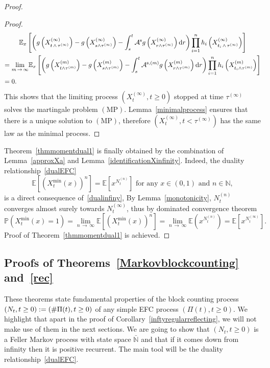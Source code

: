 \documentclass[10pt]{amsart}
\theoremstyle{definition}\newtheorem{defi}[theo]{Definition}\newtheorem{rema}[theo]{Remark}\newtheorem{exam}[theo]{Example}\newtheorem{exem}[theo]{Example}\newtheorem{nota}[theo]{Notation}
\newcommand{\ddr}{\mathrm{d}}
\newcommand{\rms}{\mathrm{s}}
\newcommand{\MP}{\mathrm{MP}}
\newcommand{\bbN}{\mathbb{N}}
\newcommand{\bbE}{\mathbb{E}}
\newcommand{\bbP}{\mathbb{P}}
\newcommand{\clA}{\mathcal{A}}
\begin{document}
\begin{proof}
\begin{proof}
\begin{multline*}
\bbE_x\left[\left(g\left(X_{t\,\wedge\,\tau^{(\infty)}}^{(\infty)}\right)-g\left(X_{s\wedge \tau^{(\infty)}}^{(\infty)}\right)-\int_{s}^{t}\clA^{\rms}g\left(X_{r\wedge \tau^{(\infty)}}^{(\infty)}\right)\ddr r\right)\prod_{i=1}^{n}h_i\left(X_{t_i\,\wedge\,\tau^{(\infty)}}^{(\infty)}\right)\right]\\
\mkern-5mu{\begin{aligned}
&=\underset{m\,\rightarrow\,\infty}{\lim} \bbE_x\left[\left(g\left(X_{t\wedge \tau^{(m)}}^{(m)}\right)-g\left(X_{s\wedge \tau^{(m)}}^{(m)}\right)-\int_{s}^{t}\clA^{\rms,(m)}g\left(X_{r\wedge \tau^{(m)}}^{(m)}\right)\ddr r\right)\prod_{i=1}^{n}h_i\left(X_{t_i\wedge \tau^{(m)}}^{(m)}\right)\right]\\
&=0.
\end{aligned}}
\end{multline*}
This shows that the limiting process $(X^{(\infty)}_t,t\geq 0)$ stopped at time $\tau^{(\infty)}$ solves the martingale problem $(\MP)$. Lemma~\ref{minimalprocess} ensures that there is a unique solution to $(\MP)$, therefore $(X^{(\infty)}_t,t<\tau^{(\infty)})$ has the same law as the minimal process.
\end{proof}

Theorem~\ref{thmmomentdual1} is finally obtained by the combination of Lemma~\ref{approxXa} and Lemma~\ref{identificationXinfinity}. Indeed, the duality relationship~\eqref{dualEFC}
\[
\bbE\left[\left(X_t^{\min}(x)\right)^n\right]=\bbE\left[x^{N_t^{(n)}}\right] \text{ for any } x\in (0,1) \text{ and } n\in \bbN,
\]
is a direct consequence of~\eqref{dualinfiny}, By Lemma~\ref{monotonicity}, $N_t^{(n)}$ converges almost surely towards $N_t^{(\infty)}$, thus by dominated convergence theorem
\begin{equation}\label{entrancelawN0}
\bbP\left(X_t^{\min}(x)=1\right)=\underset{n\,\rightarrow\,\infty}{\lim} \bbE\left[\left(X_t^{\min}(x)\right)^n\right]=\underset{n\,\rightarrow\,\infty}{\lim} \bbE\left(x^{N_t^{(n)}}\right)=\bbE\left[x^{N_t^{(\infty)}}\right].
\end{equation}
Proof of Theorem~\ref{thmmomentdual1} is achieved.
\end{proof}


\subsection{Proofs of Theorems~\ref{Markovblockcounting} and~\ref{rec}}
These theorems state fundamental properties of the block counting process $(N_t,\linebreak t\geq 0):=(\#\Pi(t),t\geq 0)$ of any simple EFC process $(\Pi(t),t\geq 0)$. We highlight that apart in the proof of Corollary~\ref{inftyregularreflecting}, we will not make use of them in the next sections. We are going to show that $(N_t,t\geq 0)$ is a Feller Markov process with state space $\bar{\bbN}$ and that if it comes down from infinity then it is positive recurrent. The main tool will be the duality relationship~\eqref{dualEFC}.
\end{document}
